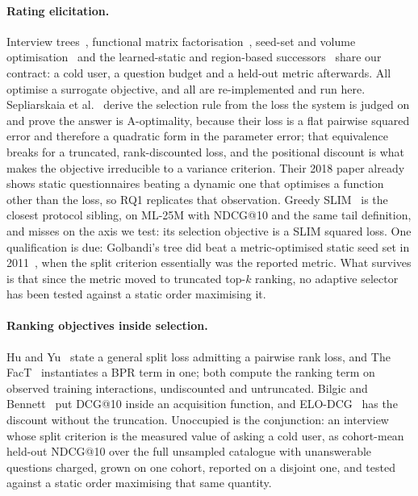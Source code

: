 \documentclass[runningheads]{llncs}
\begin{document}
\paragraph{Rating elicitation.}
Interview trees~\cite{golbandi2011adaptive,hu2013interview}, functional matrix
factorisation~\cite{zhou2011functional}, seed-set and volume
optimisation~\cite{liu2011wisdom,anava2015budget} and the learned-static and region-based
successors~\cite{kweon2020deep,nguyen2024pere,parapar2021dpe} share our contract: a cold user, a
question budget and a held-out metric afterwards. All optimise a surrogate objective, and all are re-implemented and run here. Sepliarskaia et al.~\cite{sepliarskaia2018spq} derive the selection rule from the loss
the system is judged on and prove the answer is A-optimality, because their loss is a flat pairwise
squared error and therefore a quadratic form in the parameter error; that equivalence breaks for a
truncated, rank-discounted loss, and the positional discount is what makes the objective irreducible
to a variance criterion. Their 2018 paper already shows static questionnaires beating a dynamic one that optimises a
function other than the loss, so RQ1 replicates that observation. Greedy SLIM~\cite{proissl2024greedyslim} is the closest
protocol sibling, on ML-25M with NDCG@10 and the same tail definition, and misses on the axis we
test: its selection objective is a SLIM squared loss. One qualification is due: Golbandi's tree did beat
a metric-optimised static seed set in 2011~\cite{golbandi2010bootstrapping}, when the split criterion
essentially was the reported metric. What survives is that since the metric moved to truncated
top-$k$ ranking, no adaptive selector has been tested against a static order maximising it.

\paragraph{Ranking objectives inside selection.}
Hu and Yu~\cite{hu2013interview} state a general split loss admitting a pairwise rank loss, and The
FacT~\cite{tao2019fact,haque2022factcrs} instantiates a BPR term in one; both compute the ranking
term on observed training interactions, undiscounted and untruncated. Bilgic and
Bennett~\cite{bilgic2012activequery} put DCG@10 inside an acquisition function, and
ELO-DCG~\cite{long2010elodcg} has the discount without the truncation. Unoccupied is the conjunction: an interview whose split criterion is the measured
value of asking a cold user, as cohort-mean held-out NDCG@10 over the full unsampled catalogue with
unanswerable questions charged, grown on one cohort, reported on a disjoint one, and tested against a
static order maximising that same quantity.
\end{document}
